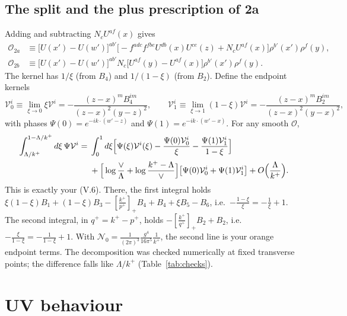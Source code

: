 \documentclass[10pt]{article}
\numberwithin{equation}{section}
\newcommand{\Nz}{\mathcal N_0}
\newcommand{\OO}{\mathcal O}
\newcommand{\VV}{\mathcal V}
\begin{document}
\subsection{The split and the plus prescription of 2a}
Adding and subtracting $N_cU^{af}(x)$ gives
\begin{align}
\OO_{2a}&\equiv\big[U(x')-U(w')\big]^{ab'}\big[-f^{adc}f^{fbe}U^{db}(x)U^{ce}(z)+N_cU^{af}(x)\big]\rho^{b'}(x')\rho^f(y),\\
\OO_{2b}&\equiv\big[U(x')-U(w')\big]^{ab'}N_c\big[U^{af}(y)-U^{af}(x)\big]\rho^{b'}(x')\rho^f(y).
\end{align}
The kernel has $1/\xi$ (from $B_4$) and $1/(1-\xi)$ (from $B_2$). Define the endpoint kernels
\begin{equation}
\VV_0^i\equiv\lim_{\xi\to0}\xi\VV^i=-\frac{(z-x)^m B_4^{im}}{(z-x)^2(y-z)^2},\qquad
\VV_1^i\equiv\lim_{\xi\to1}(1-\xi)\VV^i=-\frac{(z-x)^mB_2^{im}}{(z-x)^2(y-x)^2},
\end{equation}
with phases $\Psi(0)=e^{-ik\cdot(w'-z)}$ and $\Psi(1)=e^{-ik\cdot(w'-x)}$. For any smooth $\OO$,
\begin{align}
\int_{\Lambda/k^+}^{1-\Lambda/k^+}d\xi\,\Psi\VV^i={}&\int_0^1d\xi\Big[\Psi(\xi)\VV^i(\xi)-\frac{\Psi(0)\VV^i_0}{\xi}-\frac{\Psi(1)\VV^i_1}{1-\xi}\Big]\notag\\
&+\Big[\log\frac{\vee}{\Lambda}+\log\frac{k^+-\Lambda}{\vee}\Big]\big[\Psi(0)\VV^i_0+\Psi(1)\VV^i_1\big]+O\Big(\frac{\Lambda}{k^+}\Big).
\label{eq:plus}
\end{align}
This is exactly your (V.6). There, the first integral holds $\xi(1-\xi)B_1+(1-\xi)B_3-[\frac{k^+}{p^+}]_+B_4+B_4+\xi B_5-B_6$, i.e.\ $-\frac{1-\xi}{\xi}=-\frac1\xi+1$. The second integral, in $q^+=k^+-p^+$, holds $-[\frac{k^+}{q^+}]_+B_2+B_2$, i.e.\ $-\frac{\xi}{1-\xi}=-\frac{1}{1-\xi}+1$. With $\Nz=\frac{1}{(2\pi)^3}\frac{g^4}{16\pi^5}\frac1{k^+}$, the second line is your orange endpoint terms. The decomposition was checked numerically at fixed transverse points; the difference falls like $\Lambda/k^+$ (Table~\ref{tab:checks}).

\section{UV behaviour}\label{sec:uv}
\end{document}
